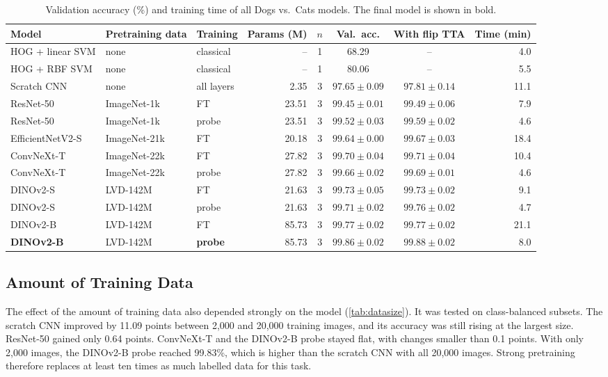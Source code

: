 \documentclass[11pt,a4paper]{article}
\newcommand{\pct}[1]{#1\%}
\begin{document}
\begin{table}[ht]
  \centering
  \small
  \caption{Validation accuracy (\%) and training time of all Dogs vs.\ Cats models. The final model is shown in bold.}
  \label{tab:models}
  \setlength{\tabcolsep}{5pt}
  \begin{tabular}{@{}lllrcccr@{}}
    \toprule
    Model & Pretraining data & Training & Params (M) & $n$ & Val.\ acc. & With flip TTA & Time (min) \\
    \midrule
    HOG + linear SVM & none & classical & -- & 1 & 68.29 & -- & 4.0 \\
    HOG + RBF SVM & none & classical & -- & 1 & 80.06 & -- & 5.5 \\
    Scratch CNN & none & all layers & 2.35 & 3 & $97.65 \pm 0.09$ & $97.81 \pm 0.14$ & 11.1 \\
    ResNet-50 & ImageNet-1k & FT & 23.51 & 3 & $99.45 \pm 0.01$ & $99.49 \pm 0.06$ & 7.9 \\
    ResNet-50 & ImageNet-1k & probe & 23.51 & 3 & $99.52 \pm 0.03$ & $99.59 \pm 0.02$ & 4.6 \\
    EfficientNetV2-S & ImageNet-21k & FT & 20.18 & 3 & $99.64 \pm 0.00$ & $99.67 \pm 0.03$ & 18.4 \\
    ConvNeXt-T & ImageNet-22k & FT & 27.82 & 3 & $99.70 \pm 0.04$ & $99.71 \pm 0.04$ & 10.4 \\
    ConvNeXt-T & ImageNet-22k & probe & 27.82 & 3 & $99.66 \pm 0.02$ & $99.69 \pm 0.01$ & 4.6 \\
    DINOv2-S & LVD-142M & FT & 21.63 & 3 & $99.73 \pm 0.05$ & $99.73 \pm 0.02$ & 9.1 \\
    DINOv2-S & LVD-142M & probe & 21.63 & 3 & $99.71 \pm 0.02$ & $99.76 \pm 0.02$ & 4.7 \\
    DINOv2-B & LVD-142M & FT & 85.73 & 3 & $99.77 \pm 0.02$ & $99.77 \pm 0.02$ & 21.1 \\
    \textbf{DINOv2-B} & LVD-142M & \textbf{probe} & 85.73 & 3 & $\mathbf{99.86 \pm 0.02}$ & $\mathbf{99.88 \pm 0.02}$ & 8.0 \\
    \bottomrule
  \end{tabular}
\end{table}

\subsection*{Amount of Training Data}

The effect of the amount of training data also depended strongly on the model (\cref{tab:datasize}). It was tested on class-balanced subsets. The scratch CNN improved by 11.09 points between 2,000 and 20,000 training images, and its accuracy was still rising at the largest size. ResNet-50 gained only 0.64 points. ConvNeXt-T and the DINOv2-B probe stayed flat, with changes smaller than 0.1 points. With only 2,000 images, the DINOv2-B probe reached \pct{99.83}, which is higher than the scratch CNN with all 20,000 images. Strong pretraining therefore replaces at least ten times as much labelled data for this task.
\end{document}
